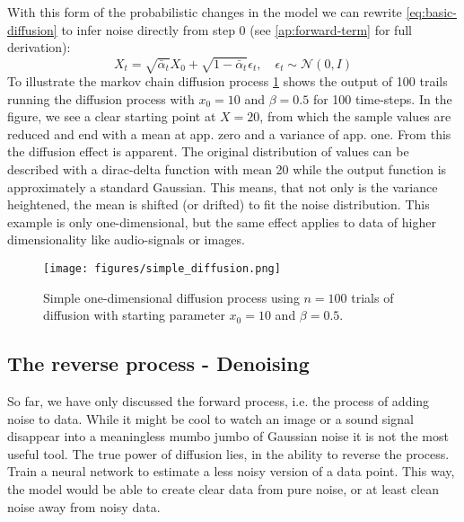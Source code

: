 \documentclass[a4paper, 12pt]{olplainarticle}
\begin{document}
With this form of the probabilistic changes in the model we can rewrite \cref{eq:basic-diffusion} to infer noise directly from step 0 (see \cref{ap:forward-term} for full derivation):
\begin{equation} \label{eq:forward-process}
    X_t = \sqrt{\bar{\alpha}_t}X_0+\sqrt{1-\bar{\alpha}_t} \epsilon_t, \quad \epsilon_t \sim \mathcal{N}(0,I)
\end{equation}
To illustrate the markov chain diffusion process \cref{fig:diffusion-process} shows the output of 100 trails running the diffusion process with $x_0 = 10$ and $\beta = 0.5$ for 100 time-steps.
In the figure, we see a clear starting point at $X = 20$, from which the sample values are reduced and end with a mean at app. zero and a variance of app. one.
From this the diffusion effect is apparent. The original distribution of values can be described with a dirac-delta function with mean 20 while the output function is approximately a standard Gaussian.
This means, that not only is the variance heightened, the mean is shifted (or drifted) to fit the noise distribution.
This example is only one-dimensional, but the same effect applies to data of higher dimensionality like audio-signals or images.
\begin{figure}[tb]
    \centering
    \texttt{[image: figures/simple\_diffusion.png]}
    \caption{Simple one-dimensional diffusion process using $n=100$ trials of diffusion with starting parameter $x_0 = 10$ and $\beta = 0.5$.}
    \label{fig:diffusion-process}
\end{figure}

\subsection*{The reverse process - Denoising}

So far, we have only discussed the forward process, i.e. the process of adding noise to data. 
While it might be cool to watch an image or a sound signal disappear into a meaningless mumbo jumbo of Gaussian noise it is not the most useful tool.
The true power of diffusion lies, in the ability to reverse the process. Train a neural network to estimate a less noisy version of a data point.
This way, the model would be able to create clear data from pure noise, or at least clean noise away from noisy data.
\end{document}
